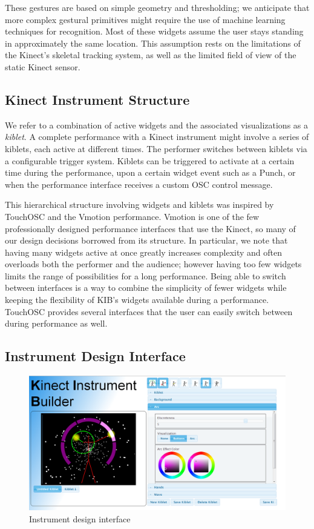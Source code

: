 \documentclass{nime-alternate}
\begin{document}
These gestures are based on simple geometry and thresholding; we anticipate that more complex
gestural primitives might require the use of machine learning techniques for recognition. Most
of these widgets assume the user stays standing in approximately the same
location. This assumption rests on the limitations of the Kinect's skeletal tracking system,
as well as the limited field of view of the static Kinect sensor.
\subsection{Kinect Instrument Structure}
We refer to a combination of active widgets and the associated visualizations as a 
\textit{kiblet}. A complete performance with a Kinect instrument might involve a series 
of kiblets, each active at different times. The performer switches between kiblets via a
configurable trigger system. Kiblets can be triggered to activate at a certain time during the
performance, upon a certain widget event such as a Punch, or when the performance interface
receives a custom OSC control message. 

This hierarchical structure involving widgets and kiblets was inspired by TouchOSC and the Vmotion 
performance. Vmotion is one of the few professionally designed performance interfaces that use the Kinect,
so many of our design decisions borrowed from its structure. In particular, we note that having many
widgets active at once greatly increases complexity and often overloads both the performer and
the audience; however having too few widgets limits the range of possibilities for a long
performance. Being able to switch between interfaces is a way to combine the simplicity of
fewer widgets while keeping the flexibility of KIB's widgets available during a performance. 
TouchOSC provides several interfaces that the user can easily switch between during performance
as well.

\subsection{Instrument Design Interface}
\begin{figure}
	\centering
		\includegraphics[width=1\columnwidth]{figures/kib.png}
	\caption{Instrument design interface}
	\label{fig:interface}
\end{figure}
\end{document}
